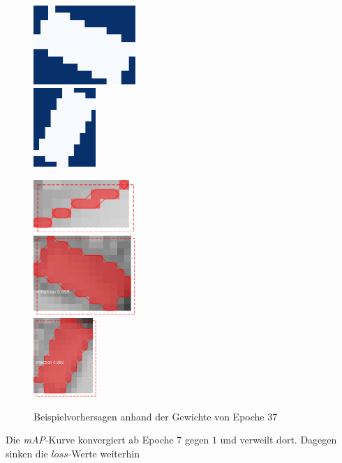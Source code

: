\begin{figure}[ht]
\begin{minipage}[c]{.3\textwidth}
  \\ \vspace{.5cm}
  \includegraphics[height=3cm]{pics/mask-2-2.png}
  \\ \vspace{.5cm}
  \includegraphics[height=3cm]{pics/mask-2-3.png}
  \end{minipage}
  \begin{minipage}[c]{.3\textwidth}
  \centering
  \includegraphics[height=2cm]{pics/pred-2-1.png}
  \\ \vspace{.5cm}
  \includegraphics[height=3cm]{pics/pred-2-2.png}
  \\ \vspace{.5cm}
  \includegraphics[height=3cm]{pics/pred-2-3.png}
  \end{minipage}

  \caption[Beispielvorhersagen Experiment 2]{Beispielvorhersagen anhand der Gewichte von Epoche 37}
  \label{fig:example-overfitting}
\end{figure}

Die \textit{mAP}-Kurve konvergiert ab Epoche 7 gegen $1$ und verweilt dort. Dagegen sinken die $loss$-Werte weiterhin